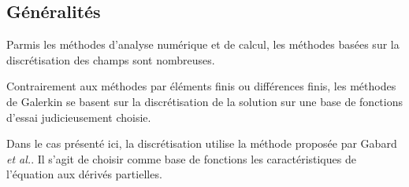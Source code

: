 \subsection{Généralités}

Parmis les méthodes d'analyse numérique et de calcul, les méthodes basées sur la discrétisation des champs sont
nombreuses.

Contrairement aux méthodes par éléments finis ou différences finis, les méthodes de Galerkin se basent sur la
discrétisation de la solution sur une base de fonctions d'essai judicieusement choisie.

Dans le cas présenté ici, la discrétisation utilise la méthode proposée par Gabard \textit{et
al.}\cite{Gabard11,Gabard15}. Il s'agit de choisir comme base de fonctions les caractéristiques de l'équation aux
dérivés partielles.

